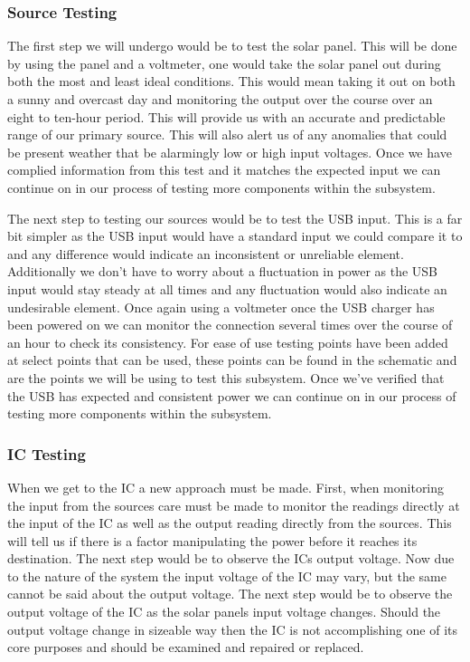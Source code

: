 \subsubsection{Source Testing}
The first step we will undergo would be to test the solar panel. This will be done by using the panel and a voltmeter, one would take the solar panel out during both the most and least ideal conditions. This would mean taking it out on both a sunny and overcast day and monitoring the output over the course over an eight to ten-hour period. This will provide us with an accurate and predictable range of our primary source. This will also alert us of any anomalies that could be present weather that be alarmingly low or high input voltages. Once we have complied information from this test and it matches the expected input we can continue on in our process of testing more components within the subsystem.

The next step to testing our sources would be to test the USB input. This is a far bit simpler as the USB input would have a standard input we could compare it to and any difference would indicate an inconsistent or unreliable element. Additionally we don't have to worry about a fluctuation in power as the USB input would stay steady at all times and any fluctuation would also indicate an undesirable element. Once again using a voltmeter once the USB charger has been powered on we can monitor the connection several times over the course of an hour to check its consistency. For ease of use testing points have been added at select points that can be used, these points can be found in the schematic and are the points we will be using to test this subsystem. Once we've verified that the USB has expected and consistent power we can continue on in our process of testing more components within the subsystem.

\subsubsection{IC Testing}
When we get to the IC a new approach must be made. First, when monitoring the input from the sources care must be made to monitor the readings directly at the input of the IC as well as the output reading directly from the sources. This will tell us if there is a factor manipulating the power before it reaches its destination. The next step would be to observe the ICs output voltage. Now due to the nature of the system the input voltage of the IC may vary, but the same cannot be said about the output voltage. The next step would be to observe the output voltage of the IC as the solar panels input voltage changes. Should the output voltage change in sizeable way then the IC is not accomplishing one of its core purposes and should be examined and repaired or replaced. 

